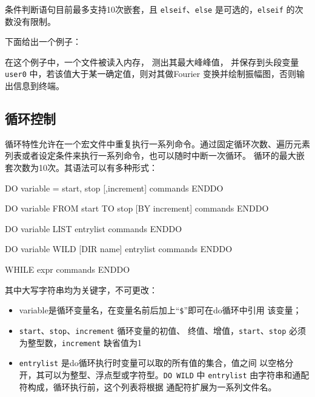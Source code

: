 条件判断语句目前最多支持10次嵌套，且 \texttt{elseif}、\texttt{else}
是可选的，\texttt{elseif} 的次数没有限制。

下面给出一个例子：
在这个例子中，一个文件被读入内存， 测出其最大峰峰值，
并保存到头段变量 \texttt{user0} 中，若该值大于某一确定值，则对其做Fourier
变换并绘制振幅图，否则输出信息到终端。

\subsection{循环控制}
循环特性允许在一个宏文件中重复执行一系列命令。通过固定循环次数、遍历元素
列表或者设定条件来执行一系列命令，也可以随时中断一次循环。
循环的最大嵌套次数为10次。其语法可以有多种形式：
\begin{SACCode}
DO variable = start, stop [,increment]
    commands
ENDDO
\end{SACCode}

\begin{SACCode}
DO variable FROM start TO stop [BY increment]
    commands
ENDDO
\end{SACCode}

\begin{SACCode}
DO variable LIST entrylist
    commands
ENDDO
\end{SACCode}

\begin{SACCode}
DO variable WILD [DIR name] entrylist
    commands
ENDDO
\end{SACCode}

\begin{SACCode}
WHILE expr
    commands
ENDDO
\end{SACCode}
其中大写字符串均为关键字，不可更改：
\begin{itemize}
\item variable是循环变量名，在变量名前后加上``\verb|$|''即可在do循环中引用
    该变量；
\item \texttt{start}、\texttt{stop}、\texttt{increment} 循环变量的初值、
    终值、增值，\texttt{start}、\texttt{stop} 必须为整型数，\texttt{increment}
    缺省值为1
\item \texttt{entrylist} 是do循环执行时变量可以取的所有值的集合，值之间
    以空格分开，其可以为整型、浮点型或字符型。\texttt{DO WILD} 中
    \texttt{entrylist} 由字符串和通配符构成，循环执行前，这个列表将根据
    通配符扩展为一系列文件名。
\end{itemize}

